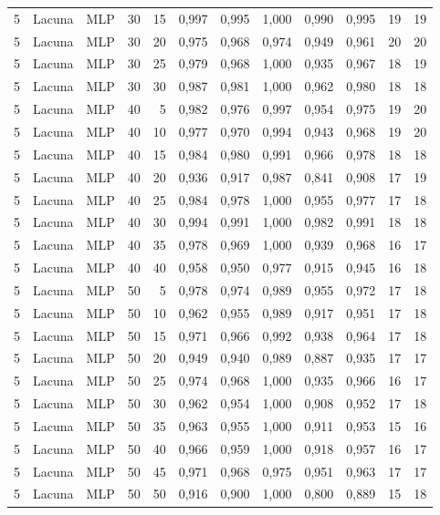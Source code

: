 \begin{longtable}{@{}rllrrrrrrrrr@{}}
5 & Lacuna & MLP & 30 & 15 & 0,997 & 0,995 & 1,000 & 0,990 & 0,995 & 19 & 19 \\
5 & Lacuna & MLP & 30 & 20 & 0,975 & 0,968 & 0,974 & 0,949 & 0,961 & 20 & 20 \\
5 & Lacuna & MLP & 30 & 25 & 0,979 & 0,968 & 1,000 & 0,935 & 0,967 & 18 & 19 \\
5 & Lacuna & MLP & 30 & 30 & 0,987 & 0,981 & 1,000 & 0,962 & 0,980 & 18 & 18 \\
5 & Lacuna & MLP & 40 & 5 & 0,982 & 0,976 & 0,997 & 0,954 & 0,975 & 19 & 20 \\
5 & Lacuna & MLP & 40 & 10 & 0,977 & 0,970 & 0,994 & 0,943 & 0,968 & 19 & 20 \\
5 & Lacuna & MLP & 40 & 15 & 0,984 & 0,980 & 0,991 & 0,966 & 0,978 & 18 & 18 \\
5 & Lacuna & MLP & 40 & 20 & 0,936 & 0,917 & 0,987 & 0,841 & 0,908 & 17 & 19 \\
5 & Lacuna & MLP & 40 & 25 & 0,984 & 0,978 & 1,000 & 0,955 & 0,977 & 17 & 18 \\
5 & Lacuna & MLP & 40 & 30 & 0,994 & 0,991 & 1,000 & 0,982 & 0,991 & 18 & 18 \\
5 & Lacuna & MLP & 40 & 35 & 0,978 & 0,969 & 1,000 & 0,939 & 0,968 & 16 & 17 \\
5 & Lacuna & MLP & 40 & 40 & 0,958 & 0,950 & 0,977 & 0,915 & 0,945 & 16 & 18 \\
5 & Lacuna & MLP & 50 & 5 & 0,978 & 0,974 & 0,989 & 0,955 & 0,972 & 17 & 18 \\
5 & Lacuna & MLP & 50 & 10 & 0,962 & 0,955 & 0,989 & 0,917 & 0,951 & 17 & 18 \\
5 & Lacuna & MLP & 50 & 15 & 0,971 & 0,966 & 0,992 & 0,938 & 0,964 & 17 & 18 \\
5 & Lacuna & MLP & 50 & 20 & 0,949 & 0,940 & 0,989 & 0,887 & 0,935 & 17 & 17 \\
5 & Lacuna & MLP & 50 & 25 & 0,974 & 0,968 & 1,000 & 0,935 & 0,966 & 16 & 17 \\
5 & Lacuna & MLP & 50 & 30 & 0,962 & 0,954 & 1,000 & 0,908 & 0,952 & 17 & 18 \\
5 & Lacuna & MLP & 50 & 35 & 0,963 & 0,955 & 1,000 & 0,911 & 0,953 & 15 & 16 \\
5 & Lacuna & MLP & 50 & 40 & 0,966 & 0,959 & 1,000 & 0,918 & 0,957 & 16 & 17 \\
5 & Lacuna & MLP & 50 & 45 & 0,971 & 0,968 & 0,975 & 0,951 & 0,963 & 17 & 17 \\
5 & Lacuna & MLP & 50 & 50 & 0,916 & 0,900 & 1,000 & 0,800 & 0,889 & 15 & 18 \\

\end{longtable}
